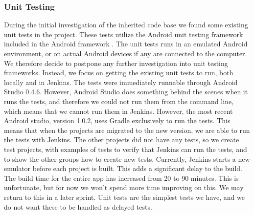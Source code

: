 \subsubsection{Unit Testing}
During the initial investigation of the inherited code base we found some existing unit tests in the  project. These tests utilize the Android unit testing framework included in the Android framework \parencite{AndroidUnit}. The unit tests runs in an emulated Android environment, or on actual Android devices if any are connected to the computer. We therefore decide to postpone any further investigation into unit testing frameworks. Instead, we focus on getting the existing unit tests to run, both locally and in Jenkins. The tests were immediately runnable through Android Studio 0.4.6. However, Android Studio does something behind the scenes when it runs the tests, and therefore we could not run them from the command line, which means that we cannot run them in Jenkins. However, the most recent Android studio, version 1.0.2, uses Gradle exclusively to run the tests. This means that when the projects are migrated to the new version, we are able to run the tests with Jenkins.
The other projects did not have any tests, so we create test projects, with examples of tests to verify that Jenkins can run the tests, and to show the other groups how to create new tests.
Currently, Jenkins starts a new emulator before each project is built. This adds a significant delay to the build. The build time for the entire app has increased from 20 to 90 minutes. This is unfortunate, but for now we won't spend more time improving on this. We may return to this in a later sprint. Unit tests are the simplest tests we have, and we do not want these to be handled as delayed tests.

